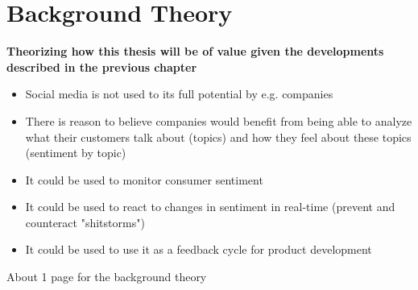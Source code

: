 
\chapter{Background Theory}

\label{ch:backgroundTheory}

\textbf{Theorizing how this thesis will be of value given the developments described in the previous chapter}


\begin{itemize}
    \item
    Social media is not used to its full potential by e.g. companies
    \item
    There is reason to believe companies would benefit from being able to analyze what their customers talk about (topics) and how they feel about these topics (sentiment by topic)
    \item
    It could be used to monitor consumer sentiment
    \item
    It could be used to react to changes in sentiment in real-time (prevent and counteract "shitstorms")
    \item
    It could be used to use it as a feedback cycle for product development
\end{itemize}

About 1 page for the background theory

\pagebreak[1]